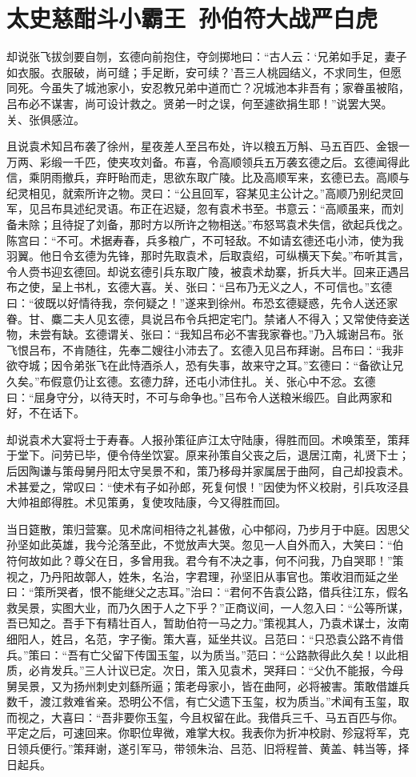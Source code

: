 \chapter{太史慈酣斗小霸王~孙伯符大战严白虎}

却说张飞拔剑要自刎，玄德向前抱住，夺剑掷地曰：“古人云：‘兄弟如手足，妻子如衣服。衣服破，尚可缝；手足断，安可续？’吾三人桃园结义，不求同生，但愿同死。今虽失了城池家小，安忍教兄弟中道而亡？况城池本非吾有；家眷虽被陷，吕布必不谋害，尚可设计救之。贤弟一时之误，何至遽欲捐生耶！”说罢大哭。关、张俱感泣。

且说袁术知吕布袭了徐州，星夜差人至吕布处，许以粮五万斛、马五百匹、金银一万两、彩缎一千匹，使夹攻刘备。布喜，令高顺领兵五万袭玄德之后。玄德闻得此信，乘阴雨撤兵，弃盱眙而走，思欲东取广陵。比及高顺军来，玄德已去。高顺与纪灵相见，就索所许之物。灵曰：“公且回军，容某见主公计之。”高顺乃别纪灵回军，见吕布具述纪灵语。布正在迟疑，忽有袁术书至。书意云：“高顺虽来，而刘备未除；且待捉了刘备，那时方以所许之物相送。”布怒骂袁术失信，欲起兵伐之。陈宫曰：“不可。术据寿春，兵多粮广，不可轻敌。不如请玄德还屯小沛，使为我羽翼。他日令玄德为先锋，那时先取袁术，后取袁绍，可纵横天下矣。”布听其言，令人赍书迎玄德回。却说玄德引兵东取广陵，被袁术劫寨，折兵大半。回来正遇吕布之使，呈上书札，玄德大喜。关、张曰：“吕布乃无义之人，不可信也。”玄德曰：“彼既以好情待我，奈何疑之！”遂来到徐州。布恐玄德疑惑，先令人送还家眷。甘、麋二夫人见玄德，具说吕布令兵把定宅门。禁诸人不得入；又常使侍妾送物，未尝有缺。玄德谓关、张曰：“我知吕布必不害我家眷也。”乃入城谢吕布。张飞恨吕布，不肯随往，先奉二嫂往小沛去了。玄德入见吕布拜谢。吕布曰：“我非欲夺城；因令弟张飞在此恃酒杀人，恐有失事，故来守之耳。”玄德曰：“备欲让兄久矣。”布假意仍让玄德。玄德力辞，还屯小沛住扎。关、张心中不忿。玄德曰：“屈身守分，以待天时，不可与命争也。”吕布令人送粮米缎匹。自此两家和好，不在话下。

却说袁术大宴将士于寿春。人报孙策征庐江太守陆康，得胜而回。术唤策至，策拜于堂下。问劳已毕，便令侍坐饮宴。原来孙策自父丧之后，退居江南，礼贤下士；后因陶谦与策母舅丹阳太守吴景不和，策乃移母并家属居于曲阿，自己却投袁术。术甚爱之，常叹曰：“使术有子如孙郎，死复何恨！”因使为怀义校尉，引兵攻泾县大帅祖郎得胜。术见策勇，复使攻陆康，今又得胜而回。

当日筵散，策归营寨。见术席间相待之礼甚傲，心中郁闷，乃步月于中庭。因思父孙坚如此英雄，我今沦落至此，不觉放声大哭。忽见一人自外而入，大笑曰：“伯符何故如此？尊父在日，多曾用我。君今有不决之事，何不问我，乃自哭耶！”策视之，乃丹阳故鄣人，姓朱，名治，字君理，孙坚旧从事官也。策收泪而延之坐曰：“策所哭者，恨不能继父之志耳。”治曰：“君何不告袁公路，借兵往江东，假名救吴景，实图大业，而乃久困于人之下乎？”正商议间，一人忽入曰：“公等所谋，吾已知之。吾手下有精壮百人，暂助伯符一马之力。”策视其人，乃袁术谋士，汝南细阳人，姓吕，名范，字子衡。策大喜，延坐共议。吕范曰：“只恐袁公路不肯借兵。”策曰：“吾有亡父留下传国玉玺，以为质当。”范曰：“公路款得此久矣！以此相质，必肯发兵。”三人计议已定。次日，策入见袁术，哭拜曰：“父仇不能报，今母舅吴景，又为扬州刺史刘繇所逼；策老母家小，皆在曲阿，必将被害。策敢借雄兵数千，渡江救难省亲。恐明公不信，有亡父遗下玉玺，权为质当。”术闻有玉玺，取而视之，大喜曰：“吾非要你玉玺，今且权留在此。我借兵三千、马五百匹与你。平定之后，可速回来。你职位卑微，难掌大权。我表你为折冲校尉、殄寇将军，克日领兵便行。”策拜谢，遂引军马，带领朱治、吕范、旧将程普、黄盖、韩当等，择日起兵。

